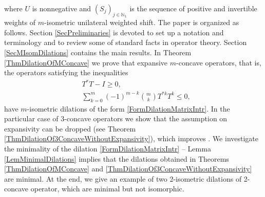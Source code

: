 \documentclass{amsart}
\renewcommand{\le}{\leqslant}
\renewcommand{\ge}{\geqslant}
\theoremstyle{definition}
\numberwithin{equation}{section}
\begin{document}
where $ U $ is nonnegative and $ (S_{j})_{j\in \mathbb{N}_{1}} $ is the sequence of positive and invertible weights of $ m $-isometric unilateral weighted shift. The paper is organized as follows. Section \ref{SecPreliminaries} is devoted to set up a notation and terminology and to review some of standard facts in operator theory. Section \ref{SecMIsomDilations} contains the main results. In Theorem \ref{ThmDilationOfMConcave} we prove that expansive $ m $-concave operators, that is, the operators satisfying the inequalities
\begin{align*}
    &T^{\ast}T - I \ge 0,\\
    &\sum_{k=0}^{m} (-1)^{m-k}\binom{m}{k}T^{\ast k}T^{k} \le 0,
\end{align*}
have $ m $-isometric dilations of the form \eqref{FormDilationMatrixIntr}. In the particular case of 3-concave operators we show that the assumption on expansivity can be dropped (see Theorem \ref{ThmDilationOf3ConcaveWithoutExpansivity}), which improves \cite[Theorem 3.1]{suciuCouplingOfOperatorsWith2IsometriesIn3IsometricLiftings}. We investigate the minimality of the dilation \eqref{FormDilationMatrixIntr} -- Lemma \ref{LemMinimalDilations} implies that the dilations obtained in Theorems \ref{ThmDilationOfMConcave} and \ref{ThmDilationOf3ConcaveWithoutExpansivity} are minimal. At the end, we give an example of two 2-isometric dilations of 2-concave operator, which are minimal but not isomorphic.
\end{document}

